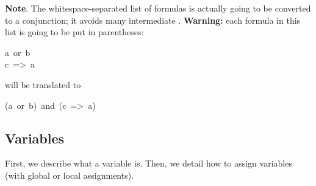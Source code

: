 \noindent\textbf{Note}.
The whitespace-separated list of formulas is actually going to be
converted to a conjunction; it avoids many intermediate .
\textbf{Warning:} each formula in this list is going to be put in
parentheses:%
\begin{mdpre}%
\noindent a~or~b\\
c~=\textgreater{}~a%
\end{mdpre}\noindent will be translated to
\begin{mdpre}%
\noindent(a~or~b)~and~(c~=\textgreater{}~a)%
\end{mdpre}\label{newline-and-note}%

\subsection{Variables}\label{sec-variables}%

\noindent First, we describe what a variable is. Then, we detail how to assign
variables (with global or local assignments).%

